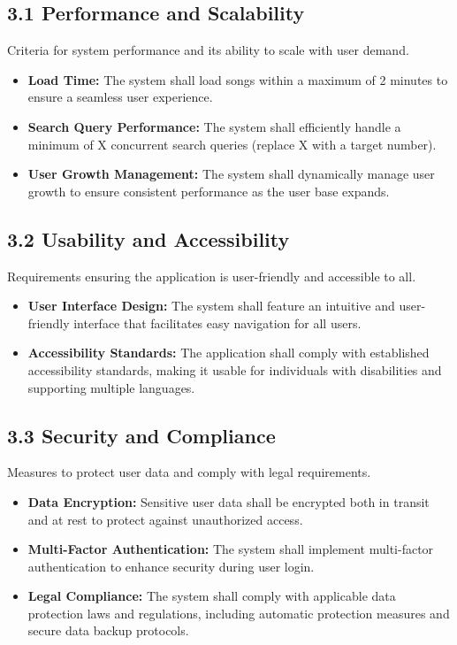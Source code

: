 \documentclass[a4paper,10pt]{article}
\begin{document}
\subsection*{3.1 Performance and Scalability}
Criteria for system performance and its ability to scale with user demand.

\begin{itemize}[leftmargin=*]
    \item \textbf{Load Time:} The system shall load songs within a maximum of 2 minutes to ensure a seamless user experience.
    \item \textbf{Search Query Performance:} The system shall efficiently handle a minimum of X concurrent search queries (replace X with a target number).
    \item \textbf{User Growth Management:} The system shall dynamically manage user growth to ensure consistent performance as the user base expands.
\end{itemize}

\subsection*{3.2 Usability and Accessibility}
Requirements ensuring the application is user-friendly and accessible to all.

\begin{itemize}[leftmargin=*]
    \item \textbf{User Interface Design:} The system shall feature an intuitive and user-friendly interface that facilitates easy navigation for all users.
    \item \textbf{Accessibility Standards:} The application shall comply with established accessibility standards, making it usable for individuals with disabilities and supporting multiple languages.
\end{itemize}

\subsection*{3.3 Security and Compliance}
Measures to protect user data and comply with legal requirements.

\begin{itemize}[leftmargin=*]
    \item \textbf{Data Encryption:} Sensitive user data shall be encrypted both in transit and at rest to protect against unauthorized access.
    \item \textbf{Multi-Factor Authentication:} The system shall implement multi-factor authentication to enhance security during user login.
    \item \textbf{Legal Compliance:} The system shall comply with applicable data protection laws and regulations, including automatic protection measures and secure data backup protocols.
\end{itemize}
\end{document}
